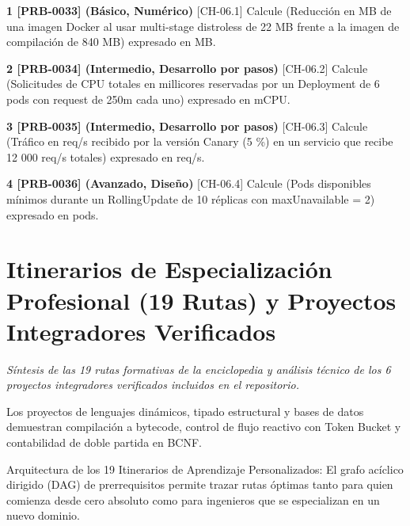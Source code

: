 \documentclass{book}
\begin{document}
\begin{tcolorbox}[title={Ejercicios}, studiumworked, breakable]

\noindent\textbf{1 [PRB-0033] (Básico, Numérico)}
[CH-06.1] Calcule (Reducción en MB de una imagen Docker al usar multi-stage distroless de 22 MB frente a la imagen de compilación de 840 MB) expresado en MB.

\noindent\textbf{2 [PRB-0034] (Intermedio, Desarrollo por pasos)}
[CH-06.2] Calcule (Solicitudes de CPU totales en millicores reservadas por un Deployment de 6 pods con request de 250m cada uno) expresado en mCPU.

\noindent\textbf{3 [PRB-0035] (Intermedio, Desarrollo por pasos)}
[CH-06.3] Calcule (Tráfico en req/s recibido por la versión Canary (5 \%) en un servicio que recibe 12 000 req/s totales) expresado en req/s.

\noindent\textbf{4 [PRB-0036] (Avanzado, Diseño)}
[CH-06.4] Calcule (Pods disponibles mínimos durante un RollingUpdate de 10 réplicas con maxUnavailable = 2) expresado en pods.
\end{tcolorbox}

\chapter{Itinerarios de Especialización Profesional (19 Rutas) y Proyectos Integradores Verificados}
\label{chap:ch-07}

\noindent\textit{Síntesis de las 19 rutas formativas de la enciclopedia y análisis técnico de los 6 proyectos integradores verificados incluidos en el repositorio.}

\begin{tcolorbox}[title={Consejo}, studiumtip, breakable]

Los proyectos de lenguajes dinámicos, tipado estructural y bases de datos demuestran compilación a bytecode, control de flujo reactivo con Token Bucket y contabilidad de doble partida en BCNF.
\end{tcolorbox}

\begin{tcolorbox}[title={Definición}, studiumdef, breakable]

Arquitectura de los 19 Itinerarios de Aprendizaje Personalizados: El grafo acíclico dirigido (DAG) de prerrequisitos permite trazar rutas óptimas tanto para quien comienza desde cero absoluto como para ingenieros que se especializan en un nuevo dominio.
\end{tcolorbox}
\end{document}
